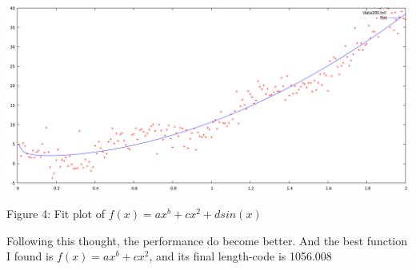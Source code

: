 \documentclass{article}
\begin{document}
\vspace{5mm}
\begin{minipage}{0.9\textwidth}
  \includegraphics[width=\textwidth,keepaspectratio]{23.png}
  \centerline{Figure 4: Fit plot of $f(x)=ax^b+cx^2+dsin(x)$}
\end{minipage}
\vspace{5mm}

\vspace{1mm}

Following this thought, the performance do become better. And the best function I found is $f(x)=ax^b+cx^2$, and its final length-code is 1056.008 
\end{document}

